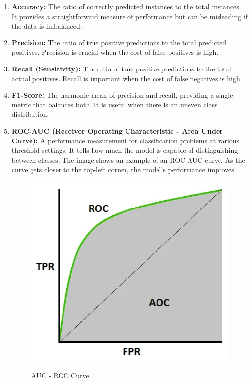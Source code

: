\begin{enumerate}
    \item \textbf{Accuracy:} The ratio of correctly predicted instances to the total instances. It provides a straightforward measure of performance but can be misleading if the data is imbalanced. \autocite{AccuracyPrecision2024}
    \item \textbf{Precision:} The ratio of true positive predictions to the total predicted positives. Precision is crucial when the cost of false positives is high.
    \item \textbf{Recall (Sensitivity):} The ratio of true positive predictions to the total actual positives. Recall is important when the cost of false negatives is high. \autocite{PrecisionRecall2024}
    \item \textbf{F1-Score:} The harmonic mean of precision and recall, providing a single metric that balances both. It is useful when there is an uneven class distribution. \autocite{Fscore2024}
    \item \textbf{ROC-AUC (Receiver Operating Characteristic - Area Under Curve):} A performance measurement for classification problems at various threshold settings. It tells how much the model is capable of distinguishing between classes. The image shows an example of an ROC-AUC curve. As the curve gets closer to the top-left corner, the model's performance improves. \autocite{ReceiverOperatingCharacteristic2024}
    \begin{figure}[hbt]
        \centering
        \begin{minipage}[t]{.6\textwidth}
        \caption{AUC - ROC Curve}
        \includegraphics[width=1\textwidth]{img/ROC_AUC.png}\\
        \label{fig:AUC-ROC}
        \end{minipage}
    \end{figure}
\end{enumerate}

